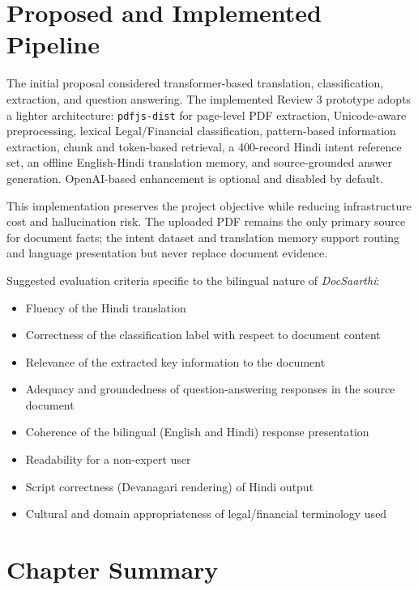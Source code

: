 \section{Proposed and Implemented Pipeline}

The initial proposal considered transformer-based translation, classification, extraction, and question answering. The implemented Review 3 prototype adopts a lighter architecture: \texttt{pdfjs-dist} for page-level PDF extraction, Unicode-aware preprocessing, lexical Legal/Financial classification, pattern-based information extraction, chunk and token-based retrieval, a 400-record Hindi intent reference set, an offline English-Hindi translation memory, and source-grounded answer generation. OpenAI-based enhancement is optional and disabled by default.

This implementation preserves the project objective while reducing infrastructure cost and hallucination risk. The uploaded PDF remains the only primary source for document facts; the intent dataset and translation memory support routing and language presentation but never replace document evidence.

Suggested evaluation criteria specific to the bilingual nature of \textit{DocSaarthi}:

\begin{itemize}
\item Fluency of the Hindi translation
\item Correctness of the classification label with respect to document content
\item Relevance of the extracted key information to the document
\item Adequacy and groundedness of question-answering responses in the source document
\item Coherence of the bilingual (English and Hindi) response presentation
\item Readability for a non-expert user
\item Script correctness (Devanagari rendering) of Hindi output
\item Cultural and domain appropriateness of legal/financial terminology used
\end{itemize}

\section*{Chapter Summary}

